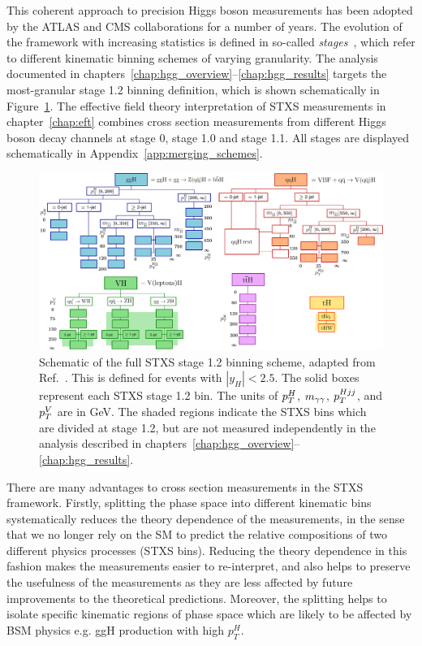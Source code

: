 This coherent approach to precision Higgs boson measurements has been adopted by the ATLAS and CMS collaborations for a number of years. The evolution of the framework with increasing statistics is defined in so-called \textit{stages}~\cite{deFlorian:2016spz,Berger:2019wnu}, which refer to different kinematic binning schemes of varying granularity. The \Hgg analysis documented in chapters~\ref{chap:hgg_overview}--\ref{chap:hgg_results} targets the most-granular stage 1.2 binning definition, which is shown schematically in Figure~\ref{fig:stxs_schematic}. The effective field theory interpretation of STXS measurements in chapter~\ref{chap:eft} combines cross section measurements from different Higgs boson decay channels at stage 0, stage 1.0 and stage 1.1. All stages are displayed schematically in Appendix~\ref{app:merging_schemes}.

\begin{figure}[htb!]
  \centering
  \includegraphics[width=1\linewidth]{Figures/theory/allSTXSbins.pdf}
  \caption[STXS stage 1.2 binning scheme]
  {
    Schematic of the full STXS stage 1.2 binning scheme, adapted from Ref.~\cite{deFlorian:2016spz}. This is defined for events with $|y_H|<2.5$. The solid boxes represent each STXS stage 1.2 bin. The units of $p_T^H$, $m_{\gamma\gamma}$, $p_T^{Hjj}$, and $p_T^V$ are in GeV. The shaded regions indicate the STXS bins which are divided at stage 1.2, but are not measured independently in the \Hgg analysis described in chapters~\ref{chap:hgg_overview}--\ref{chap:hgg_results}.
  }
  \label{fig:stxs_schematic}
\end{figure}

There are many advantages to cross section measurements in the STXS framework. Firstly, splitting the phase space into different kinematic bins systematically reduces the theory dependence of the measurements, in the sense that we no longer rely on the SM to predict the relative compositions of two different physics processes (STXS bins). Reducing the theory dependence in this fashion makes the measurements easier to re-interpret, and also helps to preserve the usefulness of the measurements as they are less affected by future improvements to the theoretical predictions. Moreover, the splitting helps to isolate specific kinematic regions of phase space which are likely to be affected by BSM physics e.g. ggH production with high $p_T^H$. 

